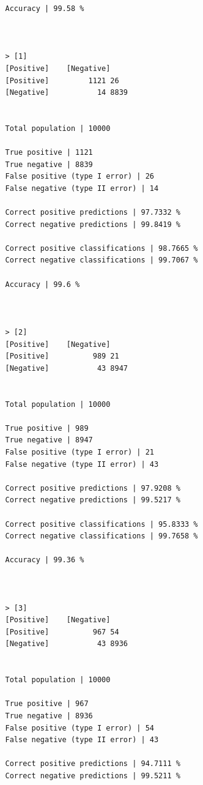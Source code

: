 \documentclass{classrep}
\begin{document}
{{{\begin{lstlisting}
                Accuracy | 99.58 %



                > [1]
                [Positive]    [Negative]
                [Positive]         1121 26
                [Negative]           14 8839


                Total population | 10000

                True positive | 1121
                True negative | 8839
                False positive (type I error) | 26
                False negative (type II error) | 14

                Correct positive predictions | 97.7332 %
                Correct negative predictions | 99.8419 %

                Correct positive classifications | 98.7665 %
                Correct negative classifications | 99.7067 %

                Accuracy | 99.6 %



                > [2]
                [Positive]    [Negative]
                [Positive]          989 21
                [Negative]           43 8947


                Total population | 10000

                True positive | 989
                True negative | 8947
                False positive (type I error) | 21
                False negative (type II error) | 43

                Correct positive predictions | 97.9208 %
                Correct negative predictions | 99.5217 %

                Correct positive classifications | 95.8333 %
                Correct negative classifications | 99.7658 %

                Accuracy | 99.36 %



                > [3]
                [Positive]    [Negative]
                [Positive]          967 54
                [Negative]           43 8936


                Total population | 10000

                True positive | 967
                True negative | 8936
                False positive (type I error) | 54
                False negative (type II error) | 43

                Correct positive predictions | 94.7111 %
                Correct negative predictions | 99.5211 %


\end{lstlisting}}}}
\end{document}
